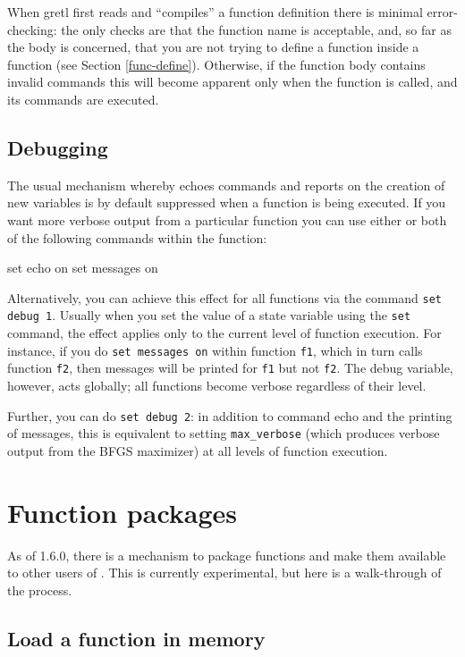 When gretl first reads and ``compiles'' a function definition there is
minimal error-checking: the only checks are that the function name is
acceptable, and, so far as the body is concerned, that you are not
trying to define a function inside a function (see Section
\ref{func-define}). Otherwise, if the function body contains invalid
commands this will become apparent only when the function is called,
and its commands are executed.

\subsection{Debugging}

The usual mechanism whereby  echoes commands and reports on
the creation of new variables is by default suppressed when a function
is being executed.  If you want more verbose output from a particular
function you can use either or both of the following commands within
the function:
%
\begin{code}
set echo on
set messages on
\end{code}

Alternatively, you can achieve this effect for all functions via
the command \texttt{set debug 1}.  Usually when you set the value of a
state variable using the \texttt{set} command, the effect applies only
to the current level of function execution.  For instance, if you do
\texttt{set messages on} within function \texttt{f1}, which in turn
calls function \texttt{f2}, then messages will be printed for
\texttt{f1} but not \texttt{f2}.  The debug variable, however, acts
globally; all functions become verbose regardless of their level.

Further, you can do \texttt{set debug 2}: in addition to command echo
and the printing of messages, this is equivalent to setting
\verb|max_verbose| (which produces verbose output from the BFGS
maximizer) at all levels of function execution.


\section{Function packages}
\label{sec:func-packages}

As of  1.6.0, there is a mechanism to package functions and
make them available to other users of .  This is currently
experimental, but here is a walk-through of the process.

\subsection{Load a function in memory}

